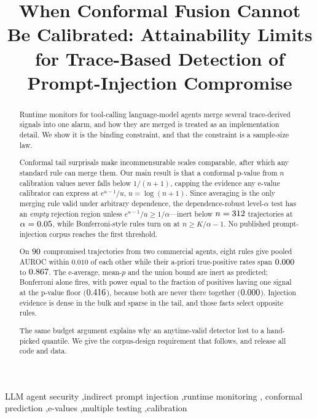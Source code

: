 \documentclass[preprint,12pt,authoryear]{elsarticle}
\theoremstyle{definition}
\begin{document}
\begin{frontmatter}

\title{When Conformal Fusion Cannot Be Calibrated: Attainability Limits
for Trace-Based Detection of Prompt-Injection Compromise}

\begin{abstract}
Runtime monitors for tool-calling language-model agents merge several
trace-derived signals into one alarm, and how they are merged is treated as an
implementation detail. We show it is the binding constraint, and that the
constraint is a sample-size law.

Conformal tail surprisals make incommensurable scales comparable, after which any
standard rule can merge them. Our main result is that a conformal p-value from $n$
calibration values never falls below $1/(n{+}1)$, capping the evidence any e-value
calibrator can express at $e^{u-1}/u$, $u = \log(n{+}1)$. Since averaging is the
only merging rule valid under arbitrary dependence, the dependence-robust
level-$\alpha$ test has an \emph{empty} rejection region unless
$e^{u-1}/u \ge 1/\alpha$---inert below $n = 312$ trajectories at
$\alpha = 0.05$, while Bonferroni-style rules turn on at
$n \ge K/\alpha - 1$. No published prompt-injection corpus reaches the first
threshold.

On $90$ compromised trajectories from two commercial agents, eight rules give
pooled AUROC within $0.010$ of each other while their a-priori true-positive rates
span $0.000$ to $0.867$. The e-average, mean-$p$ and the
union bound are inert as predicted; Bonferroni alone fires, with power equal to the
fraction of positives having one signal at the p-value floor ($0.416$), because
both are never there together ($0.000$). Injection evidence is dense in the
bulk and sparse in the tail, and those facts select opposite rules.

The same budget argument explains why an anytime-valid detector lost to a
hand-picked quantile. We give the corpus-design requirement that follows, and
release all code and data.
\end{abstract}

\begin{keyword}
LLM agent security \sep indirect prompt injection \sep runtime monitoring \sep
conformal prediction \sep e-values \sep multiple testing \sep calibration
\end{keyword}

\end{frontmatter}
\end{document}
